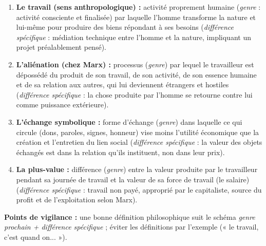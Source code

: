 \documentclass[11pt]{article}
\begin{document}
\begin{corrige}
\begin{enumerate}
    \item \textbf{Le travail (sens anthropologique) :} activité proprement humaine (\emph{genre} : activité consciente et finalisée) par laquelle l'homme transforme la nature et lui-même pour produire des biens répondant à ses besoins (\emph{différence spécifique} : médiation technique entre l'homme et la nature, impliquant un projet préalablement pensé).
    \item \textbf{L'aliénation (chez Marx) :} processus (\emph{genre}) par lequel le travailleur est dépossédé du produit de son travail, de son activité, de son essence humaine et de sa relation aux autres, qui lui deviennent étrangers et hostiles (\emph{différence spécifique} : la chose produite par l'homme se retourne contre lui comme puissance extérieure).
    \item \textbf{L'échange symbolique :} forme d'échange (\emph{genre}) dans laquelle ce qui circule (dons, paroles, signes, honneur) vise moins l'utilité économique que la création et l'entretien du lien social (\emph{différence spécifique} : la valeur des objets échangés est dans la relation qu'ils instituent, non dans leur prix).
    \item \textbf{La plus-value :} différence (\emph{genre}) entre la valeur produite par le travailleur pendant sa journée de travail et la valeur de sa force de travail (le salaire) (\emph{différence spécifique} : travail non payé, approprié par le capitaliste, source du profit et de l'exploitation selon Marx).
\end{enumerate}
\textbf{Points de vigilance :} une bonne définition philosophique suit le schéma \emph{genre prochain + différence spécifique} ; éviter les définitions par l'exemple (« le travail, c'est quand on... »).
\end{corrige}
\end{document}

